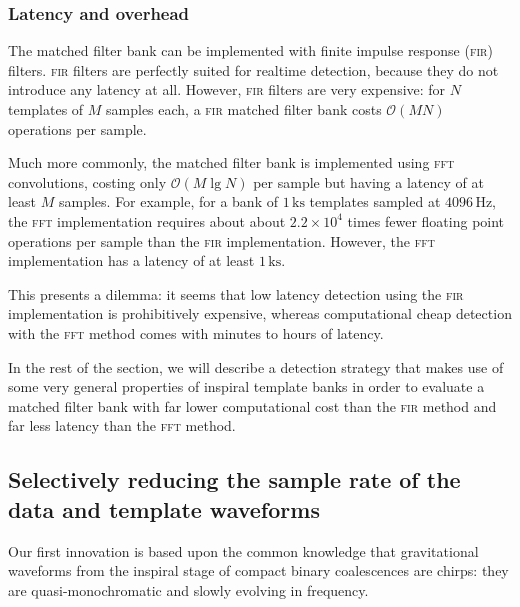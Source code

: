 \subsubsection{Latency and overhead}

The matched filter bank can be implemented with finite impulse response (\textsc{fir}) filters.  \textsc{fir} filters are perfectly suited for realtime detection, because they do not introduce any latency at all.  However, \textsc{fir} filters are very expensive: for $N$ templates of $M$ samples each, a \textsc{fir} matched filter bank costs $\mathcal O(M N)$ operations per sample.

Much more commonly, the matched filter bank is implemented using \textsc{fft} convolutions, costing only $\mathcal O(M \lg N)$  per sample but having a latency of at least $M$ samples.  For example, for a bank of $1\,\mathrm{ks}$ templates sampled at $4096\,\mathrm{Hz}$, the \textsc{fft} implementation requires about about $2.2 \times 10^4$ times fewer floating point operations per sample than the \textsc{fir} implementation.  However, the \textsc{fft} implementation has a latency of at least $1\,\mathrm{ks}$.

This presents a dilemma: it seems that low latency detection using the \textsc{fir} implementation is prohibitively expensive, whereas computational cheap detection with the \textsc{fft} method comes with minutes to hours of latency.

In the rest of the section, we will describe a detection strategy that makes use of some very general properties of inspiral template banks in order to evaluate a matched filter bank with far lower computational cost than the \textsc{fir} method and far less latency than the \textsc{fft} method.

\subsection{Selectively reducing the sample rate of the data and template waveforms}

Our first innovation is based upon the common knowledge that gravitational waveforms from the inspiral stage of compact binary coalescences are chirps: they are quasi-monochromatic and slowly evolving in frequency.


